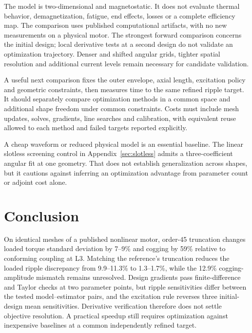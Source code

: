 \documentclass{anvil-paper}
\begin{document}
The model is two-dimensional and magnetostatic. It does not evaluate
thermal behavior, demagnetization, fatigue, end effects, losses or a
complete efficiency map. The comparison uses published computational
artifacts, with no new measurements on a physical motor. The strongest
forward comparison concerns the initial design; local derivative tests
at a second design do not validate an optimization trajectory. Denser
and shifted angular grids, tighter spatial resolution and additional
current levels remain necessary for candidate validation.

A useful next comparison fixes the outer envelope, axial length, excitation
policy and geometric constraints, then measures time to the same refined
ripple target. It should separately compare optimization methods in a
common space and additional shape freedom under common constraints.
Costs must include mesh
updates, solves, gradients, line searches and calibration, with equivalent
reuse allowed to each method and failed targets reported explicitly.

A cheap waveform or reduced physical model is an essential baseline.
The linear slotless screening control in Appendix~\ref{sec:slotless}
admits a three-coefficient angular fit at one geometry. That does not
establish generalization across shapes, but it cautions against inferring
an optimization advantage from parameter count or adjoint cost alone.

\section{Conclusion}
On identical meshes of a published nonlinear motor, order-45 truncation
changes loaded torque standard deviation by 7--9\% and cogging by 59\%
relative to conforming coupling at L3. Matching the reference's truncation
reduces the loaded ripple discrepancy from 9.9--11.3\% to 1.3--1.7\%,
while the 12.9\% cogging-amplitude mismatch remains unresolved. Design
gradients pass finite-difference and Taylor checks at two parameter points,
but ripple sensitivities differ between the tested model--estimator pairs,
and the excitation rule reverses three initial-design mean sensitivities.
Derivative verification therefore does not settle objective resolution.
A practical speedup still requires optimization against inexpensive
baselines at a common independently refined target.
\end{document}
